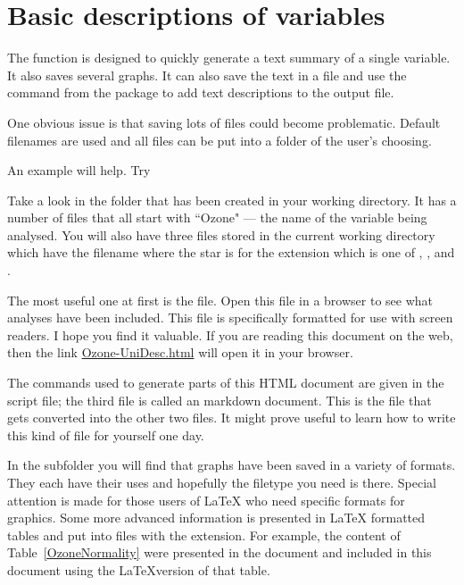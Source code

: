  
\section{Basic descriptions of variables} 
 
The  function is designed to quickly generate a text summary of a single variable. It also saves several graphs. It can also save the text in a file and use the  command from the  package to add text descriptions to the output file. 
 
One obvious issue is that saving lots of files could become problematic. Default filenames are used and all files can be put into a folder of the user's choosing. 
 
An example will help. Try 

\begin{Schunk}
\end{Schunk}

Take a look in the  folder that has been created in your working directory. It has a number of files that all start with ``Ozone" --- the name of the variable being analysed.  You will also have three files stored in the current working directory which have the filename  where the star is for the extension which is one of , , and . 
 
The most useful one at first is the  file. Open this file in a browser to see what analyses have been included. This file is specifically formatted for use with screen readers. I hope you find it valuable. If you are reading this document on the web, then the link \url{Ozone-UniDesc.html} will open it in your browser.  
 
The commands used to generate parts of this HTML document are given in the \R{} script file; the third file is called an \R{} markdown document. This is the file that gets converted into the other two files. It might prove useful to learn how to write this kind of file for yourself one day. 
 
In the  subfolder you will find that graphs have been saved in a variety of formats. They each have their uses and hopefully the filetype you need is there. Special attention is made for those users of \LaTeX{} who need specific formats for graphics. Some more advanced information is presented in \LaTeX{} formatted tables and put into files with the  extension. For example, the content of Table~\ref{OzoneNormality} were presented in the  document and included in this document using the \LaTeX{}version of that table. 
 
 

